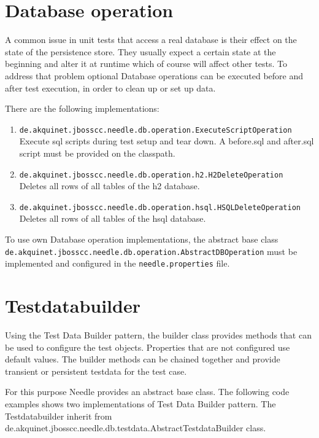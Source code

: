 \section{Database operation}

A common issue in unit tests that access a real database is their effect on the state of the persistence store.
They usually expect a certain state at the beginning and alter it at runtime which of course will affect other tests.
To address that problem optional Database operations can be executed before and after test execution, in order to clean up or set up data. 

There are the following implementations:
\begin{enumerate}
\item \verb|de.akquinet.jbosscc.needle.db.operation.ExecuteScriptOperation| \\ Execute sql scripts during test setup and tear down. A before.sql and after.sql script must be provided on the classpath.
\item \verb|de.akquinet.jbosscc.needle.db.operation.h2.H2DeleteOperation| \\ Deletes all rows of all tables of the h2 database.
\item \verb|de.akquinet.jbosscc.needle.db.operation.hsql.HSQLDeleteOperation| \\ Deletes all rows of all tables of the hsql database.
\end{enumerate}

To use own Database operation implementations, the abstract base class \verb|de.akquinet.jbosscc.needle.db.operation.AbstractDBOperation| must be implemented and configured in the \verb|needle.properties| file.

\section{Testdatabuilder}

Using the Test Data Builder pattern, the builder class provides methods that can be used to configure the test objects. 
Properties that are not configured use default values. The builder methods can be chained together and provide transient or persistent testdata for the test case.

For this purpose Needle provides an abstract base class. The following code examples shows two implementations of Test Data Builder pattern. The Testdatabuilder inherit from 
de.akquinet.jbosscc.needle.db.testdata.\-AbstractTestdataBuilder class. 

